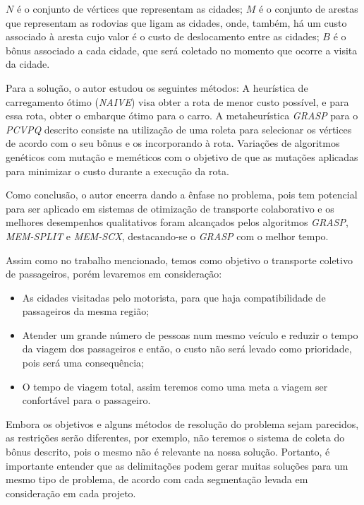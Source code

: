 $N$ é o conjunto de vértices que representam as cidades;
$M$ é o conjunto de arestas que representam as rodovias que ligam as cidades, onde, também, há um custo associado à aresta cujo valor é o custo de deslocamento entre as cidades;
$B$ é o bônus associado a cada cidade, que será coletado no momento que ocorre a visita da cidade.

Para a solução, o autor estudou os seguintes métodos:
A heurística de carregamento ótimo (\emph{NAIVE}) visa obter a rota de menor custo possível, e para essa rota, obter o embarque ótimo para o carro.
A metaheurística \emph{GRASP} para o \emph{PCVPQ} descrito consiste na utilização de uma roleta para selecionar os vértices de acordo com o seu bônus e os incorporando à rota.
Variações de algoritmos genéticos com mutação e meméticos com o objetivo de que as mutações aplicadas para minimizar o custo durante a execução da rota.

Como conclusão, o autor encerra dando a ênfase no problema, pois tem potencial para ser aplicado em sistemas de otimização de transporte colaborativo e os melhores desempenhos qualitativos foram alcançados pelos algoritmos \emph{GRASP}, \emph{MEM-SPLIT} e \emph{MEM-SCX}, destacando-se o \emph{GRASP} com o melhor tempo.

Assim como no trabalho mencionado, temos como objetivo o transporte coletivo de passageiros, porém levaremos em consideração:
\begin{itemize}
    \item As cidades visitadas pelo motorista, para que haja compatibilidade de passageiros da mesma região;
    \item Atender um grande número de pessoas num mesmo veículo e reduzir o tempo da viagem dos passageiros e então, o custo não será levado como prioridade, pois será uma consequência;
    \item O tempo de viagem total, assim teremos como uma meta a viagem ser confortável para o passageiro.
\end{itemize}

Embora os objetivos e alguns métodos de resolução do problema sejam parecidos, as restrições serão diferentes, por exemplo, não teremos o sistema de coleta do bônus descrito, pois o mesmo não é relevante na nossa solução. Portanto, é importante entender que as delimitações podem gerar muitas soluções para um mesmo tipo de problema, de acordo com cada segmentação levada em consideração em cada projeto.

